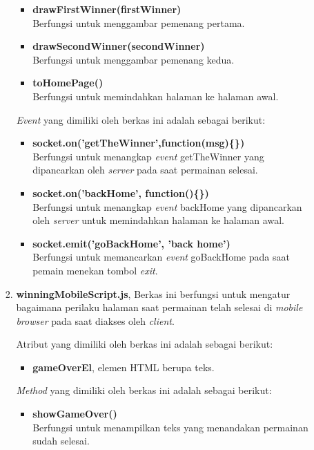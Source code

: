 \begin{enumerate}
\begin{enumerate}
\begin{enumerate}
\begin{itemize}
				\item \textbf{drawFirstWinner(firstWinner)} \\
				Berfungsi untuk menggambar pemenang pertama.
				
				\item \textbf{drawSecondWinner(secondWinner)} \\
				Berfungsi untuk menggambar pemenang kedua.
				
				\item \textbf{toHomePage()} \\
				Berfungsi untuk memindahkan halaman ke halaman awal.
			\end{itemize}
			
			\textit{Event} yang dimiliki oleh berkas ini adalah sebagai berikut:
			\begin{itemize}
				\item \textbf{socket.on('getTheWinner',function(msg)\{\})} \\
				Berfungsi untuk menangkap \textit{event} getTheWinner yang dipancarkan oleh \textit{server} pada saat permainan selesai.
				
				\item \textbf{socket.on('backHome', function()\{\})}  \\
				Berfungsi untuk menangkap \textit{event} backHome yang dipancarkan oleh \textit{server} untuk memindahkan halaman ke halaman awal.
				
				\item \textbf{socket.emit('goBackHome', 'back home')} \\
				Berfungsi untuk memancarkan \textit{event} goBackHome pada saat pemain menekan tombol \textit{exit}. 
				 
			\end{itemize}
			
			\item \textbf{winningMobileScript.js}, Berkas ini berfungsi untuk mengatur bagaimana perilaku halaman saat permainan telah selesai di \textit{mobile browser} pada saat diakses oleh \textit{client}.
			
			Atribut yang dimiliki oleh berkas ini adalah sebagai berikut:
			\begin{itemize}
				\item \textbf{gameOverEl}, elemen HTML berupa teks.
			\end{itemize}
			
			\textit{Method} yang dimiliki oleh berkas ini adalah sebagai berikut:
			\begin{itemize}
				\item \textbf{showGameOver()} \\
				Berfungsi untuk menampilkan teks yang menandakan permainan sudah selesai.
				

\end{itemize}
\end{enumerate}
\end{enumerate}
\end{enumerate}
